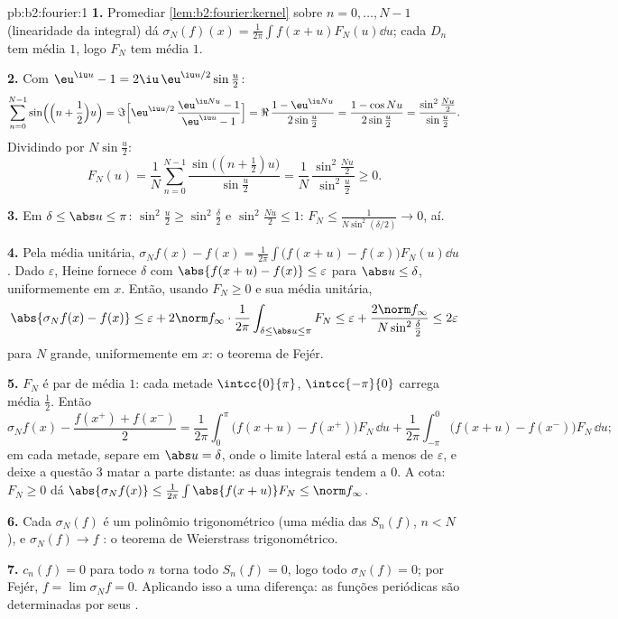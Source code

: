 \begin{solution}{pb:b2:fourier:1}
\textbf{1.} Promediar \cref{lem:b2:fourier:kernel} sobre $n = 0,
\dots, N-1$ (linearidade da integral) dá $\sigma_N(f)(x) =
\frac{1}{2\pi}\int f(x+u)F_N(u)\dd u$; cada $D_n$ tem média
$1$, logo $F_N$ tem média $1$.

\textbf{2.} Com $\eu^{\iu u} - 1 = 2\iu\,\eu^{\iu
u/2}\sin\frac u2$:
\[
\sum_{n=0}^{N-1}\sin\Bigl(\Bigl(n + \frac12\Bigr)u\Bigr)
= \Im\Bigl[\eu^{\iu u/2}\,\frac{\eu^{\iu Nu} - 1}{\eu^{\iu u}
- 1}\Bigr]
= \Re\,\frac{1 - \eu^{\iu Nu}}{2\sin\frac u2}
= \frac{1 - \cos Nu}{2\sin\frac u2}
= \frac{\sin^2\frac{Nu}2}{\sin\frac u2} .
\]
Dividindo por $N\sin\frac u2$:
\[
F_N(u) = \frac1N\sum_{n=0}^{N-1}
\frac{\sin\bigl((n+\frac12)u\bigr)}{\sin\frac u2}
= \frac{1}{N}\,
\frac{\sin^2\frac{Nu}{2}}{\sin^2\frac u2} \geq 0 .
\]

\textbf{3.} Em $\delta \leq \abs u \leq \pi$: $\sin^2\frac u2
\geq \sin^2\frac\delta2$ e $\sin^2\frac{Nu}2 \leq 1$: $F_N
\leq \frac{1}{N\sin^2(\delta/2)} \to 0$,  aí.

\textbf{4.} Pela média unitária, $\sigma_Nf(x) - f(x) =
\frac{1}{2\pi}\int\bigl(f(x+u) - f(x)\bigr)F_N(u)\dd u$. Dado
$\varepsilon$, Heine fornece $\delta$ com $\abs{f(x+u) - f(x)}
\leq \varepsilon$ para $\abs u \leq \delta$, uniformemente em $x$.
Então, usando $F_N \geq 0$ e sua média unitária,
\[
\abs{\sigma_Nf(x) - f(x)}
\leq \varepsilon +
2\norm f_\infty\cdot\frac{1}{2\pi}
\int_{\delta\leq\abs u\leq\pi}F_N
\leq \varepsilon + \frac{2\norm
f_\infty}{N\sin^2\frac\delta2}
\leq 2\varepsilon
\]
para $N$ grande, uniformemente em $x$: o teorema de Fejér.

\textbf{5.} $F_N$ é par de média $1$: cada metade
$\intcc{0}{\pi}$, $\intcc{-\pi}{0}$ carrega média $\frac12$.
Então
\[
\sigma_Nf(x) - \frac{f(x^+)+f(x^-)}{2}
= \frac{1}{2\pi}\int_0^\pi\bigl(f(x+u) -
f(x^+)\bigr)F_N\,\dd u
+ \frac{1}{2\pi}\int_{-\pi}^0\bigl(f(x+u) -
f(x^-)\bigr)F_N\,\dd u ;
\]
em cada metade, separe em $\abs u = \delta$, onde o limite lateral
está a menos de $\varepsilon$, e deixe a questão 3 matar a parte
distante: as duas integrais tendem a $0$. A cota: $F_N \geq 0$
dá $\abs{\sigma_Nf(x)} \leq
\frac{1}{2\pi}\int\abs{f(x+u)}F_N \leq \norm f_\infty$.

\textbf{6.} Cada $\sigma_N(f)$ é um polinômio trigonométrico
(uma média das $S_n(f)$, $n < N$), e $\sigma_N(f) \to f$
: o teorema de Weierstrass trigonométrico.

\textbf{7.} $c_n(f) = 0$ para todo $n$ torna todo $S_n(f) = 0$,
logo todo $\sigma_N(f) = 0$; por Fejér, $f = \lim\sigma_Nf =
0$. Aplicando isso a uma diferença: as funções periódicas
 são determinadas por seus .


\end{solution}
